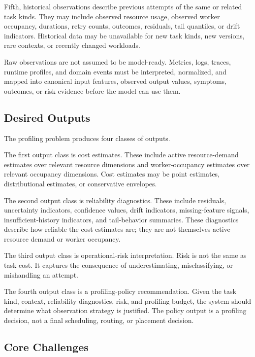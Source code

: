 Fifth, historical observations describe previous attempts of the same or related
task kinds. They may include observed resource usage, observed worker occupancy,
durations, retry counts, outcomes, residuals, tail quantiles, or drift
indicators. Historical data may be unavailable for new task kinds, new versions,
rare contexts, or recently changed workloads.

Raw observations are not assumed to be model-ready. Metrics, logs, traces,
runtime profiles, and domain events must be interpreted, normalized, and mapped
into canonical input features, observed output values, symptoms, outcomes, or
risk evidence before the model can use them.

\subsection{Desired Outputs}
\label{sec:problem-desired-outputs}

The profiling problem produces four classes of outputs.

The first output class is cost estimates. These include active resource-demand
estimates over relevant resource dimensions and worker-occupancy estimates over
relevant occupancy dimensions. Cost estimates may be point estimates,
distributional estimates, or conservative envelopes.

The second output class is reliability diagnostics. These include residuals,
uncertainty indicators, confidence values, drift indicators, missing-feature
signals, insufficient-history indicators, and tail-behavior summaries. These
diagnostics describe how reliable the cost estimates are; they are not
themselves active resource demand or worker occupancy.

The third output class is operational-risk interpretation. Risk is not the same
as task cost. It captures the consequence of underestimating, misclassifying, or
mishandling an attempt.

The fourth output class is a profiling-policy recommendation. Given the task
kind, context, reliability diagnostics, risk, and profiling budget, the system
should determine what observation strategy is justified. The policy output is a
profiling decision, not a final scheduling, routing, or placement decision.

\subsection{Core Challenges}
\label{sec:problem-core-challenges}

